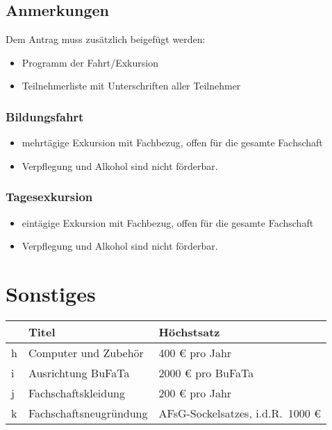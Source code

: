 \documentclass{article}
\begin{document}
    \subsection{Anmerkungen}
    Dem Antrag muss zusätzlich beigefügt werden:
        \begin{itemize}
            \item Programm der Fahrt/Exkursion
            \item Teilnehmerliste mit Unterschriften aller Teilnehmer
        \end{itemize}
        \subsubsection{Bildungsfahrt}
            \begin{itemize}
                \item  mehrtägige Exkursion mit Fachbezug, offen für die gesamte Fachschaft
                \item Verpflegung und Alkohol sind nicht förderbar.
            \end{itemize}
        
        \subsubsection{Tagesexkursion}
            \begin{itemize}
                \item eintägige Exkursion mit Fachbezug, offen für die gesamte Fachschaft
                \item Verpflegung und Alkohol sind nicht förderbar.
            \end{itemize}
            

    
\section{Sonstiges}
    \setlength\extrarowheight{2mm} \sffamily
    \begin{tabular}{l||L{6cm}|L{7cm}}
        &\textbf{Titel} & \textbf{Höchstsatz}\\[1mm] \hline \hline
        h&
        Computer und Zubehör &
        400 € pro Jahr \\[1mm] \hline
         

         
        i&
        Ausrichtung BuFaTa  &
        2000 € pro BuFaTa \\[1mm] \hline
        
        j&
        Fachschaftskleidung&
        200 € pro Jahr \\[1mm] \hline
         
        k&
        Fachschaftsneugründung &
        AFsG-Sockelsatzes, i.d.R.\ 1000 € \\[1mm]
    \end{tabular}
    \rmfamily
\end{document}
